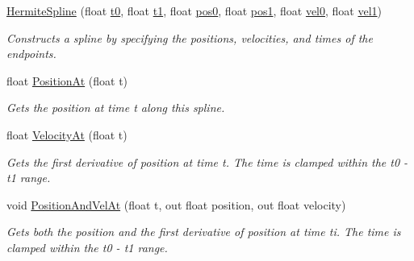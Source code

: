 \begin{DoxyCompactItemize}
\mbox{\hyperlink{struct_leap_1_1_unity_1_1_animation_1_1_hermite_spline_a289495b1edbbd687888b5dbcb926b10e}{Hermite\+Spline}} (float \mbox{\hyperlink{struct_leap_1_1_unity_1_1_animation_1_1_hermite_spline_a2d1381278deb0c8a20be0162ffd9106a}{t0}}, float \mbox{\hyperlink{struct_leap_1_1_unity_1_1_animation_1_1_hermite_spline_a68d2fbf1f78bfff7933605b9480775a0}{t1}}, float \mbox{\hyperlink{struct_leap_1_1_unity_1_1_animation_1_1_hermite_spline_a98993395f6b4ba8c68e7bcfe827bf308}{pos0}}, float \mbox{\hyperlink{struct_leap_1_1_unity_1_1_animation_1_1_hermite_spline_ac124f1bd8febef9b9472856c383e9698}{pos1}}, float \mbox{\hyperlink{struct_leap_1_1_unity_1_1_animation_1_1_hermite_spline_ace4a3fb92bc4e44b6a844da6fb7c5a2b}{vel0}}, float \mbox{\hyperlink{struct_leap_1_1_unity_1_1_animation_1_1_hermite_spline_a99576b3c8cd67280f5ec30a1e2555c9b}{vel1}})
\begin{DoxyCompactList}\small\item\em Constructs a spline by specifying the positions, velocities, and times of the endpoints. \end{DoxyCompactList}\item 
float \mbox{\hyperlink{struct_leap_1_1_unity_1_1_animation_1_1_hermite_spline_ad4db7c2122beaff31e89eb7e2e0dde36}{Position\+At}} (float t)
\begin{DoxyCompactList}\small\item\em Gets the position at time t along this spline. \end{DoxyCompactList}\item 
float \mbox{\hyperlink{struct_leap_1_1_unity_1_1_animation_1_1_hermite_spline_a8b5ecafdf1258f99abc38c0dbfa2a762}{Velocity\+At}} (float t)
\begin{DoxyCompactList}\small\item\em Gets the first derivative of position at time t. The time is clamped within the t0 -\/ t1 range. \end{DoxyCompactList}\item 
void \mbox{\hyperlink{struct_leap_1_1_unity_1_1_animation_1_1_hermite_spline_af2db5d94c701fade7bfa01d5b55f97ea}{Position\+And\+Vel\+At}} (float t, out float position, out float velocity)
\begin{DoxyCompactList}\small\item\em Gets both the position and the first derivative of position at time ti. The time is clamped within the t0 -\/ t1 range. \end{DoxyCompactList}\end{DoxyCompactItemize}
